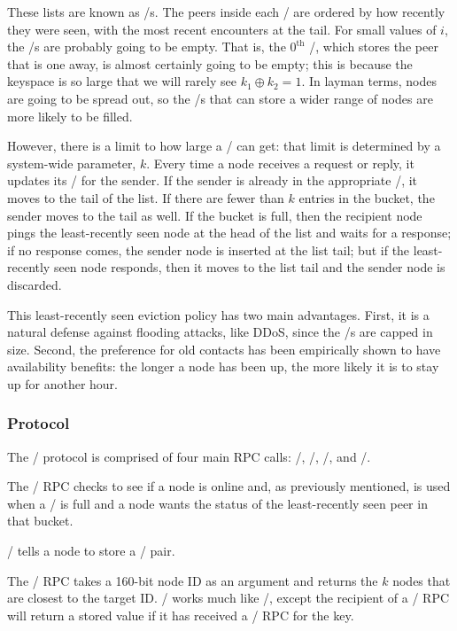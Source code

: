 \documentclass[11pt,twocolumn]{article}
\begin{document}
These lists are known as \kbucket/s.
The peers inside each \kbucket/ are ordered by how recently they were seen, with the most recent encounters at the tail.
For small values of $i$, the \kbucket/s are probably going to be empty.
That is, the $0^{\mathrm{th}}$ \kbucket/, which stores the peer that is one away, is almost certainly going to be empty; this is because the keyspace is so large that we will rarely see $k_1 \oplus k_2 = 1$.
In layman terms, nodes are going to be spread out, so the \kbucket/s that can store a wider range of nodes are more likely to be filled.

However, there is a limit to how large a \kbucket/ can get: that limit is determined by a system-wide parameter, $k$.
Every time a node receives a request or reply, it updates its \kbucket/ for the sender.
If the sender is already in the appropriate \kbucket/, it moves to the tail of the list.
If there are fewer than $k$ entries in the bucket, the sender moves to the tail as well.
If the bucket is full, then the recipient node pings the least-recently seen node at the head of the list and waits for a response; if no response comes, the sender node is inserted at the list tail; but if the least-recently seen node responds, then it moves to the list tail and the sender node is discarded.

This least-recently seen eviction policy has two main advantages.
First, it is a natural defense against flooding attacks, like DDoS, since the \kbucket/s are capped in size.
Second, the preference for old contacts has been empirically shown to have availability benefits: the longer a node has been up, the more likely it is to stay up for another hour.

\subsubsection{Protocol}

The \Kademlia/ protocol is comprised of four main RPC calls: \ping/, \store/, \findNode/, and \findValue/.

The \ping/ RPC checks to see if a node is online and, as previously mentioned, is used when a \kbucket/ is full and a node wants the status of the least-recently seen peer in that bucket.

\store/ tells a node to store a \kv/ pair.

The \findNode/ RPC takes a 160-bit node ID as an argument and returns the $k$ nodes that are closest to the target ID.
\findValue/ works much like \findNode/, except the recipient of a \findValue/ RPC will return a stored value if it has received a \store/ RPC for the key.
\end{document}
